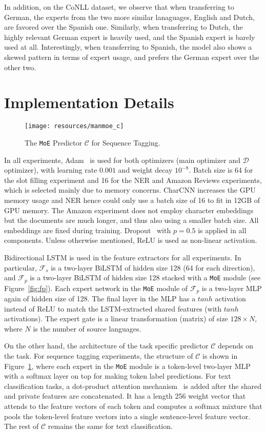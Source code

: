 \documentclass[11pt,a4paper]{article}
\def\gC{{\mathcal{C}}}
\def\gD{{\mathcal{D}}}
\def\gF{{\mathcal{F}}}
\newcommand{\moe}{\texttt{MoE}}
\begin{document}
In addition, on the CoNLL dataset, we observe that when transferring to German, the experts from the two more similar lanaguages, English and Dutch, are favored over the Spanish one.
Similarly, when transferring to Dutch, the highly relevant German expert is heavily used, and the Spanish expert is barely used at all.
Interestingly, when transferring to Spanish, the model also shows a skewed pattern in terms of expert usage, and prefers the German expert over the other two. \section{Implementation Details}\label{sec:implementation}

\begin{figure}
    \centering
    \texttt{[image: resources/manmoe\_c]}
    \caption{The \moe{} Predictor $\gC$ for Sequence Tagging.}
    \label{fig:c}
\end{figure}
 
In all experiments, Adam~\cite{kingma2014adam} is used for both optimizers (main optimizer and $\gD$ optimizer), with learning rate $0.001$ and weight decay $10^{-8}$.
Batch size is 64 for the slot filling experiment and 16 for the NER and Amazon Reviews experiments, which is selected mainly due to memory concerns.
CharCNN increases the GPU memory usage and NER hence could only use a batch size of 16 to fit in 12GB of GPU memory.
The Amazon experiment does not employ character embeddings but the documents are much longer, and thus also using a smaller batch size.
All embeddings are fixed during training.
Dropout~\cite{JMLR:v15:srivastava14a} with $p=0.5$ is applied in all components.
Unless otherwise mentioned, ReLU is used as non-linear activation.

Bidirectional LSTM is used in the feature extractors for all experiments.
In particular, $\gF_s$ is a two-layer BiLSTM of hidden size 128 (64 for each direction), and $\gF_p$ is a two-layer BiLSTM of hidden size 128 stacked with a \moe{} module (see Figure~\ref{fig:fp}).
Each expert network in the \moe{} module of $\gF_p$ is a two-layer MLP again of hidden size of 128.
The final layer in the MLP has a $tanh$ activation instead of ReLU to match the LSTM-extracted shared features (with $tanh$ activations).
The expert gate is a linear transformation (matrix) of size $128\times N$, where $N$ is the number of source languages.

On the other hand, the architecture of the task specific predictor $\gC$ depends on the task.
For sequence tagging experiments, the structure of $\gC$ is shown in Figure~\ref{fig:c}, where each expert in the \moe{} module is a token-level two-layer MLP with a softmax layer on top for making token label predictions.
For text classification tasks, a dot-product attention mechanism~\cite{D15-1166} is added after the shared and private features are concatenated.
It has a length 256 weight vector that attends to the feature vectors of each token and computes a softmax mixture that pools the token-level feature vectors into a single sentence-level feature vector.
The rest of $\gC$ remains the same for text classification.
\end{document}
